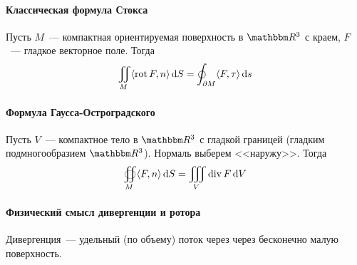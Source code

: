 \documentclass[12pt,draft,timbord]{longnotes}
\begin{document}
\paragraph{Классическая формула Стокса}
\label{par:dg::stocks}

\begin{thrm}\label{thrm:dg::stocks}
  Пусть $M$~--- компактная ориентируемая поверхность в $\R^3$ с краем, $F$~--- гладкое векторное
  поле.
  Тогда
  \[
    \iint_M \langle \operatorname{rot} F , n\rangle \, \mathrm{d} S = \oint_{\partial M} \langle F,\tau \rangle\, \mathrm{d} s
  \]
\end{thrm}

\paragraph{Формула Гаусса-Остроградского}
\label{par:dg::gaussost}


\begin{thrm}\label{thrm:dg::gaussost}
  Пусть $V$~--- компактное тело в $\R^3$ с гладкой границей (гладким подмногообразием $\R^3$).
  Нормаль выберем <<наружу>>.  Тогда
  \[
    \oiint_M \langle F,n \rangle\, \mathrm{d} S = \iiint_V \operatorname{div} F\, \mathrm{d} V
  \]
\end{thrm}

\paragraph{Физический смысл дивергенции и ротора}
\label{par:dg::physdiv}

Дивергенция~--- удельный (по объему) поток через через бесконечно малую поверхность.
\end{document}

